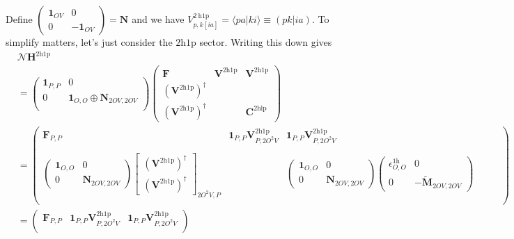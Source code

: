 Define $\begin{pmatrix} \bm{1}_{OV} & 0 \\
0 & -\bm{1}_{OV} \end{pmatrix} = \bm{N}$ and we have $V_{p, k[ia]}^{2 \mathrm{~h} 1 \mathrm{p}} = \langle p a | k i \rangle \equiv (pk|ia)$. To simplify matters, let's just consider the $2\mathrm{h1p}$ sector. Writing this down gives
\begin{align}
&\bm{\mathcal{N}} \bm{H}^{2\mathrm{h1p}}\\ &= \begin{pmatrix}
\bm{1}_{P,P} & 0 \\
0 & \bm{1}_{O,O} \oplus \bm{N}_{2OV,2OV} \\
\end{pmatrix}
\begin{pmatrix}
\bm{F} & \bm{V}^{2\mathrm{h1p}} & \bm{V}^{2\mathrm{h1p}} \\
\left(\bm{V}^{2\mathrm{h1p}}\right)^{\dagger} &  &  \\
\left(\bm{V}^{2\mathrm{h1p}}\right)^{\dagger} &  & \bm{C}^{2\mathrm{hlp}}
\end{pmatrix} \\
&= \begin{pmatrix}\bm{F}_{P,P} & \bm{1}_{P,P} \bm{V}^{2\mathrm{h1p}}_{P,2O^2V} & \bm{1}_{P,P} \bm{V}^{2\mathrm{h1p}}_{P,2O^2V} \\
& &  &  & & \\
\begin{pmatrix}
\bm{1}_{O,O} & 0 \\
0 & \bm{N}_{2OV,2OV}
\end{pmatrix}
\begin{bmatrix}
\left( \bm{V}^{2\mathrm{h1p}} \right)^{\dagger} \\ \left( \bm{V}^{2\mathrm{h1p}}\right)^{\dagger}\end{bmatrix}_{2O^2V,P} &  &\begin{pmatrix}
\bm{1}_{O,O} & 0 \\
0 & \bm{N}_{2OV,2OV}
\end{pmatrix}\begin{pmatrix}
    \epsilon^{1\mathrm{h}}_{O,O} & 0 \\
    0 & -\tilde{\mathbf{M}}_{2OV,2OV}
\end{pmatrix} \\
\end{pmatrix}\\
&= \begin{pmatrix}\bm{F}_{P,P} & \bm{1}_{P,P} \bm{V}^{2\mathrm{h1p}}_{P,2O^2V} & \bm{1}_{P,P} \bm{V}^{2\mathrm{h1p}}_{P,2O^2V} \\

\end{pmatrix}
\end{align}
